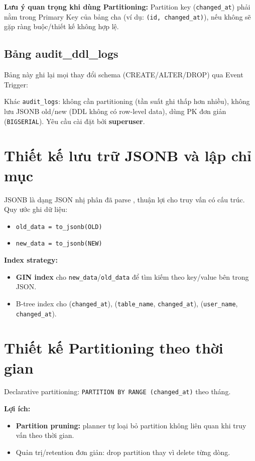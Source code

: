 \begin{sloppypar}\noindent \textbf{Lưu ý quan trọng khi dùng Partitioning:} Partition key (\texttt{changed\_at}) phải nằm trong Primary Key của bảng cha (ví dụ: \texttt{(id, changed\_at)}), nếu không sẽ gặp ràng buộc/thiết kế không hợp lệ.\end{sloppypar}

\subsection{Bảng audit\_ddl\_logs}

Bảng này ghi lại mọi thay đổi schema (CREATE/ALTER/DROP) qua Event Trigger:

Khác \texttt{audit\_logs}: không cần partitioning (tần suất ghi thấp hơn nhiều), không lưu JSONB old/new (DDL không có row-level data), dùng PK đơn giản (\texttt{BIGSERIAL}). Yêu cầu cài đặt bởi \textbf{superuser}.

\section{Thiết kế lưu trữ JSONB và lập chỉ mục}

JSONB là dạng JSON nhị phân đã parse \cite{PG16JSONB}, thuận lợi cho truy vấn có cấu trúc. Quy ước ghi dữ liệu:
\begin{itemize}
    \item \texttt{old\_data = to\_jsonb(OLD)}
    \item \texttt{new\_data = to\_jsonb(NEW)}
\end{itemize}

\textbf{Index strategy:}
\begin{itemize}
    \item \textbf{GIN index} \cite{PG16GIN} cho \texttt{new\_data}/\texttt{old\_data} để tìm kiếm theo key/value bên trong JSON.
    \item B-tree index cho (\texttt{changed\_at}), (\texttt{table\_name}, \texttt{changed\_at}), (\texttt{user\_name}, \texttt{changed\_at}).
\end{itemize}

\section{Thiết kế Partitioning theo thời gian}

Declarative partitioning: \texttt{PARTITION\ BY\ RANGE\ (changed\_at)} \cite{PG16Partitioning} theo tháng.

\textbf{Lợi ích:}
\begin{itemize}
    \item \textbf{Partition pruning:} planner tự loại bỏ partition không liên quan khi truy vấn theo thời gian.
    \item Quản trị/retention đơn giản: drop partition thay vì delete từng dòng.
\end{itemize}

